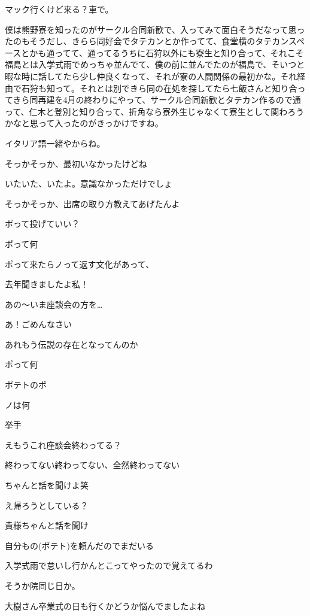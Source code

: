 \begin{multicols}{3}
マック行くけど来る？車で。

僕は熊野寮を知ったのがサークル合同新歓で、入ってみて面白そうだなって思ったのもそうだし、きらら同好会でタテカンとか作ってて、食堂横のタテカンスペースとかも通ってて、通ってるうちに石狩以外にも寮生と知り合って、それこそ福島とは入学式雨でめっちゃ並んでて、僕の前に並んでたのが福島で、そいつと暇な時に話してたら少し仲良くなって、それが寮の人間関係の最初かな。それ経由で石狩も知って。それとは別できら同の在処を探してたら七飯さんと知り合ってきら同再建を4月の終わりにやって、サークル合同新歓とタテカン作るので通って、仁木と登別と知り合って、折角なら寮外生じゃなくて寮生として関わろうかなと思って入ったのがきっかけですね。

イタリア語一緒やからね。

そっかそっか、最初いなかったけどね

いたいた、いたよ。意識なかっただけでしょ

そっかそっか、出席の取り方教えてあげたんよ

ポって投げていい？

ポって何

ポって来たらノって返す文化があって、

去年聞きましたよ私！

あの～いま座談会の方を…

あ！ごめんなさい

あれもう伝説の存在となってんのか

ポって何

ポテトのポ

ノは何

挙手

えもうこれ座談会終わってる？

終わってない終わってない、全然終わってない

ちゃんと話を聞けよ笑

え帰ろうとしている？

貴様ちゃんと話を聞け

自分もの(ポテト)を頼んだのでまだいる

入学式雨で怠いし行かんとこってやったので覚えてるわ

そうか院同じ日か。

大樹さん卒業式の日も行くかどうか悩んでましたよね


\end{multicols}

